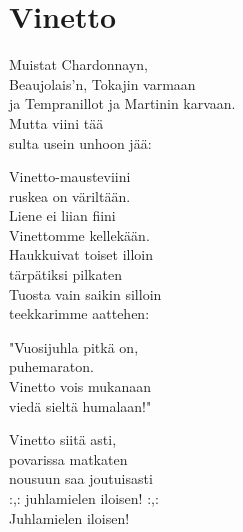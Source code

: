 \section{Vinetto}
Muistat Chardonnayn,\\
Beaujolais'n, Tokajin varmaan\\
ja Tempranillot ja Martinin karvaan.\\
Mutta viini tää\\
sulta usein unhoon jää:

Vinetto-mausteviini\\
ruskea on väriltään.\\
Liene ei liian fiini\\
Vinettomme kellekään.\\
Haukkuivat toiset illoin\\
tärpätiksi pilkaten\\
Tuosta vain saikin silloin\\
teekkarimme aattehen:

"Vuosijuhla pitkä on,\\
puhemaraton.\\
Vinetto vois mukanaan\\
viedä sieltä humalaan!"

Vinetto siitä asti,\\
povarissa matkaten\\
nousuun saa joutuisasti\\
:,: juhlamielen iloisen! :,:\\
Juhlamielen iloisen!